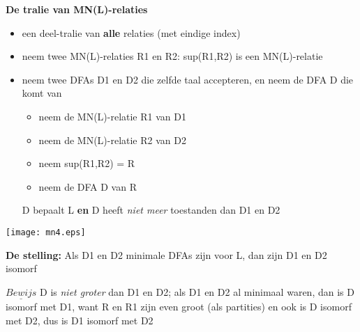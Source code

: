 \documentclass{seminar}
\newcommand{\openpagina}{}
\begin{document}
\begin{slide}
{\bf De tralie van MN(L)-relaties}

\begin{itemize}
\item een deel-tralie van {\bf alle} relaties (met eindige index)
\item neem twee MN(L)-relaties R1 en R2: sup(R1,R2) is een MN(L)-relatie
\item neem twee DFAs D1 en D2 die zelfde taal accepteren, en neem de
DFA D die komt van
\begin{itemize}
\item neem de MN(L)-relatie R1 van D1
\item neem de MN(L)-relatie R2 van D2
\item neem sup(R1,R2) = R
\item neem de DFA D van R
\end{itemize}
D bepaalt L {\bf en} D heeft {\em niet meer}
toestanden dan D1 en D2
\end{itemize}


\end{slide} \openpagina

\begin{slide}

\texttt{[image: mn4.eps]}

{\bf De stelling:}
Als D1 en D2 minimale DFAs zijn voor L, dan zijn D1 en D2 isomorf


{\bf $\underline{Bewijs}$}
D is {\em niet groter} dan D1 en D2; als D1 en D2 al minimaal waren, dan
is D isomorf met D1, want R en R1 zijn even groot (als partities) en ook is D isomorf met D2, dus is D1 isomorf met D2
\end{slide} \openpagina
\end{document}
